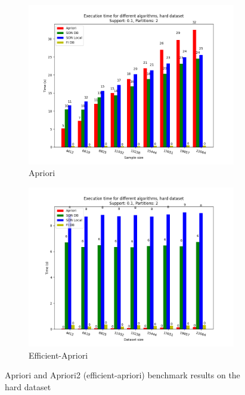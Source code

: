 \documentclass[a4paper]{article}
\begin{document}
	\begin{figure}[h]
		\centering
		\begin{subfigure}[b]{0.49\textwidth}
			\centering
			\includegraphics[width=\textwidth]{hard_aprioribenchmark.png}
         	\caption{Apriori}
		\end{subfigure}
		\hfill		
		\begin{subfigure}[b]{0.49\textwidth}
			\centering
			\includegraphics[width=\textwidth]{hard_apriori2benchmark.png}
         	\caption{Efficient-Apriori}
		\end{subfigure}
		\hfill
		\caption{Apriori and Apriori2 (efficient-apriori) benchmark results on the hard dataset}
		\label{fig:aprioribenchmark-h}
	\end{figure}
\end{document}
